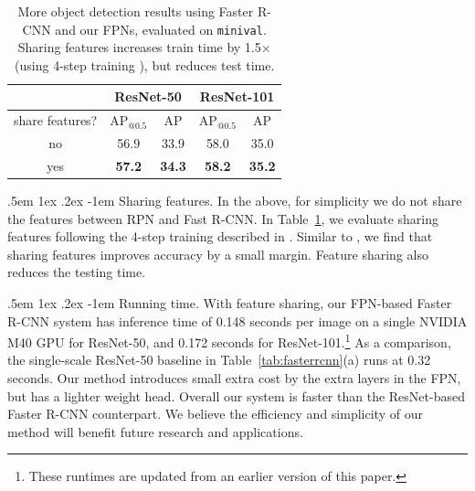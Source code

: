 \documentclass[10pt,twocolumn,letterpaper]{article}
\makeatletter
\newcommand{\bd}[1]{\textbf{#1}}
\renewcommand\paragraph{\@startsection{paragraph}{4}{\z@}%
  {.5em \@plus1ex \@minus.2ex}%
  {-1em}%
  {\normalfont\normalsize\bfseries}}
\makeatother
\begin{document}
\setlength{\tabcolsep}{6pt}
\renewcommand{\arraystretch}{1.1}
\begin{table}[t]
\begin{center}
\footnotesize
\begin{tabular}{c|c|c|c|c}
			& \multicolumn{2}{c|}{ResNet-50}
			& \multicolumn{2}{c}{ResNet-101}\\
\hline
share features? & AP$_{@0.5}$ & AP & AP$_{@0.5}$ & AP \\
\shline
no	& 56.9 			& 33.9		& 58.0		&35.0			\\
yes	& \bd{57.2} 			& \bd{34.3} 		& \bd{58.2}		& \bd{35.2}			\\
\end{tabular}
\end{center}
\caption{More object detection results using Faster R-CNN and our FPNs, evaluated on \texttt{minival}. Sharing features increases train time by 1.5$\times$ (using 4-step training \cite{Ren2015a}), but reduces test time.
}\vspace{-3mm}
\label{tab:more}
\end{table}

\paragraph{Sharing features.}
In the above,  for simplicity we do not share the features between RPN and Fast R-CNN.
In Table~\ref{tab:more}, we evaluate sharing features following the 4-step training described in \cite{Ren2015a}.
Similar to \cite{Ren2015a}, we find that sharing features improves accuracy by a small margin. Feature sharing also reduces the testing time.

\paragraph{Running time.}
With feature sharing, our FPN-based Faster R-CNN system has inference time of 0.148 seconds per image on a single NVIDIA M40 GPU for ResNet-50, and 0.172 seconds for ResNet-101.\footnote{These runtimes are updated from an earlier version of this paper.}
As a comparison, the single-scale ResNet-50 baseline in Table~\ref{tab:fasterrcnn}(a) runs at 0.32 seconds.
Our method introduces small extra cost by the extra layers in the FPN, but has a lighter weight head. 
Overall our system is faster than the ResNet-based Faster R-CNN counterpart.
We believe the efficiency and simplicity of our method will benefit future research and applications.
\end{document}
